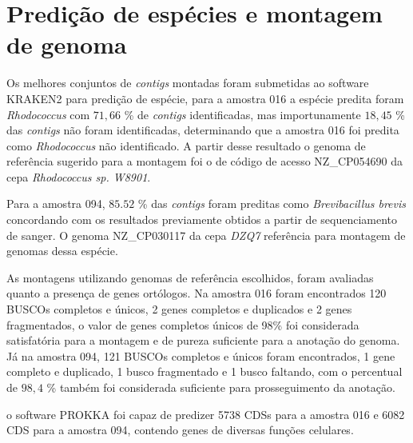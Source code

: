 \section{Predição de espécies e montagem de genoma}

Os melhores conjuntos de \textit{contigs} montadas foram submetidas ao software KRAKEN2 para predição de espécie,
para a amostra 016 a espécie predita foram \textit{Rhodococcus} com $71,66$ \% de \textit{contigs} identificadas, mas importunamente
$18,45$ \% das \textit{contigs} não foram identificadas, determinando que a amostra 016 foi predita como \textit{Rhodococcus}
não identificado. A partir desse resultado o genoma de referência sugerido para a montagem foi o de código
de acesso NZ\_CP054690 da cepa \textit{Rhodococcus sp. W8901}. 

Para a amostra 094, $85.52$ \% das \textit{contigs} foram preditas como \textit{Brevibacillus brevis}
concordando com os resultados previamente obtidos a partir de sequenciamento de sanger. O genoma NZ\_CP030117
da cepa \textit{DZQ7} referência para montagem de genomas dessa espécie.

As montagens utilizando genomas de referência escolhidos, foram avaliadas quanto a presença de genes 
ortólogos. Na amostra 016 foram encontrados 120 BUSCOs completos e únicos, 2 genes completos e duplicados e 2 genes fragmentados,
 o valor de genes completos únicos de 98\% foi considerada satisfatória para a montagem e de pureza suficiente para
a anotação do genoma. Já na amostra 094, 121 BUSCOs completos e únicos foram encontrados, 1 gene completo e duplicado, 1 busco fragmentado
e 1 busco faltando, com o percentual de $98,4$ \% também foi considerada suficiente para prosseguimento da anotação.

o software PROKKA foi capaz de predizer 5738 CDSs para a amostra 016 e 6082 CDS para a amostra 094, contendo genes
de diversas funções celulares. 